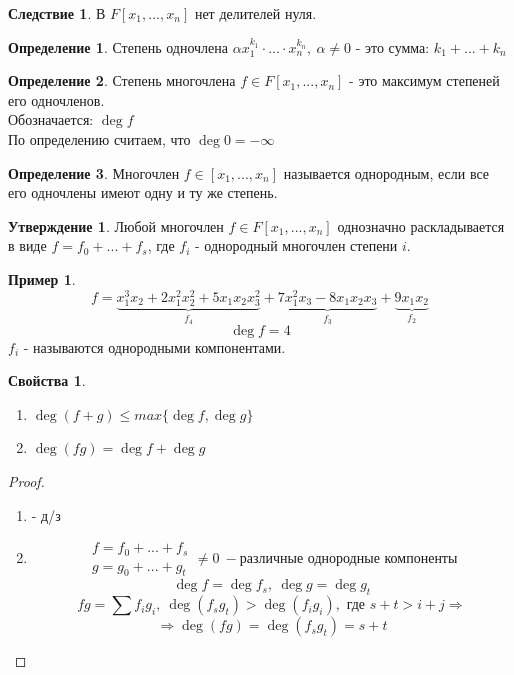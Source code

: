 \documentclass[a4paper, 12pt]{article}
\newcommand\tab[1][.5cm]{\hspace*{#1}}
\theoremstyle{definition}
\newtheorem*{definition}{Определение}
\newtheorem*{consequense}{Следствие}
\newtheorem*{subtheorem}{Утверждение}
\newtheorem*{example1}{Пример}
\newtheorem*{properties}{Свойства}
\begin{document}
  \begin{consequense}
    В $F[x_1,...,x_n]$ нет делителей нуля. 
  \end{consequense}
  \begin{definition}
    Степень одночлена $\alpha x_1^{k_1} \cdot ... \cdot x_n^{k_n}, \ \alpha \neq 0$ - это сумма: $k_1+...+k_n$   
  \end{definition}
  \begin{definition}
    Степень многочлена $f \in F[x_1,...,x_n]$ - это максимум степеней его одночленов.\\
    Обозначается: $\deg f$\\
    По определению считаем, что $\deg 0 = -\infty$   
  \end{definition}
  \begin{definition}
    Многочлен $f \in [x_1,...,x_n]$ называется однородным, если все его одночлены имеют одну и ту же степень. 
  \end{definition}
  \begin{subtheorem}
    Любой многочлен $f \in F[x_1,...,x_n]$ однозначно раскладывается в виде $f = f_0+...+f_s$, где $f_i$ - однородный многочлен степени $i$.   
  \end{subtheorem}
  \begin{example1}
    $$f= \underbrace{x_1^3x_2+2x_1^2x_2^2 + 5x_1x_2x_3^2}_{f_4}  + \underbrace{7x_1^2x_3 - 8x_1x_2x_3}_{f_3} + \underbrace{9x_1x_2}_{f_2}$$
    $$\deg f = 4$$
    $f_i$ - называются однородными компонентами.   
  \end{example1}
  \begin{properties}\tab
    \begin{enumerate}
      \item $\deg (f+g) \leq max \{\deg f, \deg g\}$
      \item $\deg (fg) = \deg f + \deg g$ 
    \end{enumerate}
  \end{properties}
  \begin{proof}\tab
    \begin{enumerate}
      \item - д/з
      \item 
        $$\begin{matrix}
          f = f_0+...+f_s\\
          g = g_0+...+g_t
        \end{matrix} \neq 0 \ - \text{различные однородные компоненты}$$
        $$\deg f = \deg f_s, \ \deg g = \deg g_t$$
        $$fg = \sum f_ig_i, \ \deg (f_sg_t) > \deg (f_ig_i), \text{ где } s+t > i+j \Longrightarrow $$
        $$\Longrightarrow \deg (fg) = \deg (f_sg_t) = s+t$$    
    \end{enumerate}
  \end{proof}
\end{document}
